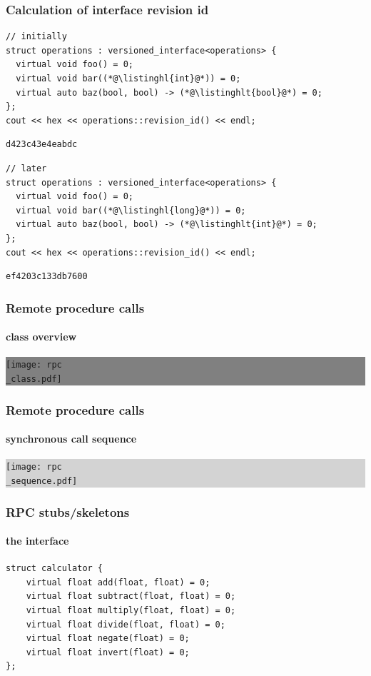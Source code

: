 \documentclass[aspectratio=169,compress,table,xcolor=table]{beamer}
\begin{document}
\begin{frame}[fragile]
  \frametitle{Calculation of interface revision id}
    \smaller
    \begin{lstlisting}[language=c++2x,basicstyle=\scriptsize\ttfamily]
// initially
struct operations : versioned_interface<operations> {
  virtual void foo() = 0;
  virtual void bar((*@\listinghl{int}@*)) = 0;
  virtual auto baz(bool, bool) -> (*@\listinghlt{bool}@*) = 0;
};
cout << hex << operations::revision_id() << endl;
    \end{lstlisting}
    \begin{verbatim}
d423c43e4eabdc
    \end{verbatim}
    \vfill
    \begin{lstlisting}[language=c++2x,basicstyle=\scriptsize\ttfamily]
// later
struct operations : versioned_interface<operations> {
  virtual void foo() = 0;
  virtual void bar((*@\listinghl{long}@*)) = 0;
  virtual auto baz(bool, bool) -> (*@\listinghlt{int}@*) = 0;
};
cout << hex << operations::revision_id() << endl;
    \end{lstlisting}
    \begin{verbatim}
ef4203c133db7600
    \end{verbatim}
\end{frame}
\begin{frame}
  \frametitle{Remote procedure calls}
  \framesubtitle{class overview}
  \colorbox{gray}{
    \begin{minipage}{\dimexpr\textwidth\relax}
    \centering
    \texttt{[image: rpc\\\_class.pdf]}
    \end{minipage}
  }
\end{frame}
\begin{frame}
  \frametitle{Remote procedure calls}
  \framesubtitle{synchronous call sequence}
  \colorbox{lightgray}{
    \begin{minipage}{\dimexpr\textwidth\relax}
    \centering
    \texttt{[image: rpc\\\_sequence.pdf]}
    \end{minipage}
  }
\end{frame}
\begin{frame}[fragile]
  \frametitle{RPC stubs/skeletons}
  \framesubtitle{the interface}
  \begin{lstlisting}[language=c++2x,basicstyle=\normalsize\ttfamily]
struct calculator {
    virtual float add(float, float) = 0;
    virtual float subtract(float, float) = 0;
    virtual float multiply(float, float) = 0;
    virtual float divide(float, float) = 0;
    virtual float negate(float) = 0;
    virtual float invert(float) = 0;
};
  \end{lstlisting}
\end{frame}
\end{document}
